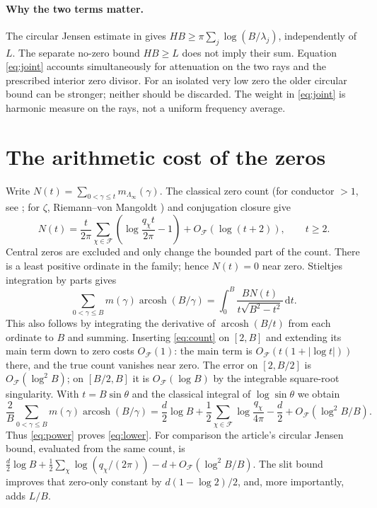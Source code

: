 \documentclass[11pt]{article}
\theoremstyle{remark}\newtheorem{remark}[theorem]{Remark}
\newcommand{\arcosh}{\operatorname{arcosh}}\newcommand{\ord}{\operatorname{ord}}
\newcommand{\F}{\mathcal F}\newcommand{\dd}{\mathrm d}
\begin{document}
\paragraph{Why the two terms matter.} The circular Jensen estimate in \cite{rec} gives $HB\ge\pi\sum_j\log(B/\lambda_j)$, independently of $L$. The separate no-zero bound $HB\ge L$ does not imply their sum. Equation \eqref{eq:joint} accounts simultaneously for attenuation on the two rays and the prescribed interior zero divisor. For an isolated very low zero the older circular bound can be stronger; neither should be discarded. The weight in \eqref{eq:joint} is harmonic measure on the rays, not a uniform frequency average.

\section{The arithmetic cost of the zeros}
Write $N(t)=\sum_{0<\gamma\le t}m_{\Lambda_\infty}(\gamma)$. The classical zero count (for conductor $>1$, see \cite{count}; for $\zeta$, Riemann--von Mangoldt \cite{mv}) and conjugation closure give
\begin{equation}\label{eq:count}
 N(t)=\frac{t}{2\pi}\sum_{\chi\in\F}\left(\log\frac{q_\chi t}{2\pi}-1\right)+O_{\F}(\log(t+2)),\qquad t\ge2.
\end{equation}
Central zeros are excluded and only change the bounded part of the count. There is a least positive ordinate in the family; hence $N(t)=0$ near zero. Stieltjes integration by parts gives
\begin{equation}\label{eq:stieltjes}
 \sum_{0<\gamma\le B}m(\gamma)\arcosh(B/\gamma)
   =\int_0^B\frac{B N(t)}{t\sqrt{B^2-t^2}}\,\dd t.
\end{equation}
This also follows by integrating the derivative of $\arcosh(B/t)$ from each ordinate to $B$ and summing. Inserting \eqref{eq:count} on $[2,B]$ and extending its main term down to zero costs $O_{\F}(1)$: the main term is $O_{\F}(t(1+|\log t|))$ there, and the true count vanishes near zero. The error on $[2,B/2]$ is $O_{\F}(\log^2 B)$; on $[B/2,B]$ it is $O_{\F}(\log B)$ by the integrable square-root singularity. With $t=B\sin\theta$ and the classical integral of $\log\sin\theta$ we obtain
\begin{equation}\label{eq:sum}
 \frac2B\sum_{0<\gamma\le B}m(\gamma)\arcosh(B/\gamma)
 =\frac d2\log B+\frac12\sum_{\chi\in\F}\log\frac{q_\chi}{4\pi}-\frac d2
  +O_{\F}(\log^2 B/B).
\end{equation}
Thus \eqref{eq:power} proves \eqref{eq:lower}. For comparison the article's circular Jensen bound, evaluated from the same count, is $\tfrac d2\log B+\tfrac12\sum_\chi\log(q_\chi/(2\pi))-d+O_{\F}(\log^2 B/B)$. The slit bound improves that zero-only constant by $d(1-\log2)/2$, and, more importantly, adds $L/B$.
\end{document}
